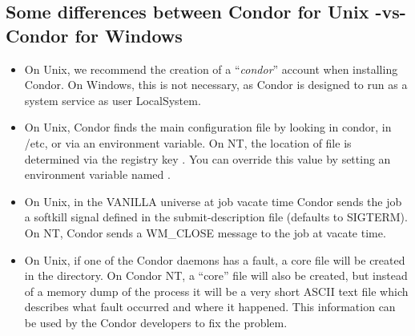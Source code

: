 \subsection{Some differences between Condor for Unix -vs- Condor for Windows}

\begin{itemize}

\item On Unix, we recommend the creation of a ``\textit{condor}'' account
when installing Condor.  On Windows, this is not necessary, as Condor is
designed to run as a system service as user LocalSystem.

\item On Unix, Condor finds the  main configuration
file by looking in \Tilde condor, in /etc, or via an environment variable.
On NT, the location of  file is determined
via the registry key .
You can override this value by setting an environment variable named
.

\item On Unix, in the VANILLA universe at job vacate time Condor sends the
job a softkill signal defined in the submit-description file (defaults to
SIGTERM).  On NT, Condor sends a WM\_CLOSE message to the job at vacate
time.

\item On Unix, if one of the Condor daemons has a fault, a core file
will be created in the  directory.  On Condor NT, a
``core'' file will also be created, but instead of a memory dump of the
process it will be a very short ASCII text file which describes what
fault occurred and where it happened.  This information can be used by
the Condor developers to fix the problem.

\end{itemize}

